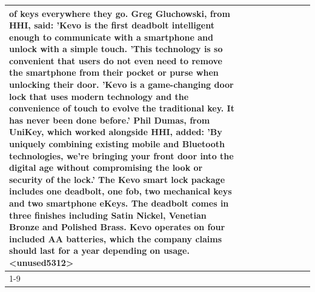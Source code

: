 \begin{table}[H]
\begin{tabular}{lllrlllll}
of keys everywhere they go. Greg Gluchowski, from HHI, said: 'Kevo is the first deadbolt intelligent enough to communicate with a smartphone and unlock with a simple touch. 'This technology is so convenient that users do not even need to remove the smartphone from their pocket or purse when unlocking their door. 'Kevo is a game-changing door lock that uses modern technology and the convenience of touch to evolve the traditional key. It has never been done before.' Phil Dumas, from UniKey, which worked alongside HHI, added: 'By uniquely combining existing mobile and Bluetooth technologies, we’re bringing your front door into the digital age without compromising the look or security of the lock.' The Kevo smart lock package includes one deadbolt, one fob, two mechanical keys and two smartphone eKeys. The deadbolt comes in three finishes including Satin Nickel, Venetian Bronze and Polished Brass. Kevo operates on four included AA batteries, which the company claims should last for a year depending on usage.<unused5312> \\
\cline{1-9}

\end{tabular}
\end{table}
